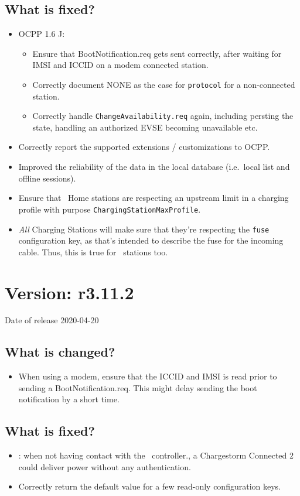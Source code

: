 \documentclass{scrartcl}
\begin{document}
\subsection*{What is fixed?}
\begin{itemize}
\item OCPP 1.6 J:
  \begin{itemize}
  \item Ensure that BootNotification.req gets sent correctly, after waiting
    for IMSI and ICCID on a modem connected station.
  \item Correctly document NONE as the case for \verb|protocol| for a
    non-connected station.
  \item Correctly handle \verb|ChangeAvailability.req| again, including
    persting the state, handling an authorized EVSE becoming unavailable etc.
  \end{itemize}
\item Correctly report the supported extensions / customizations to OCPP.
\item Improved the reliability of the data in the local database (i.e.\ local
  list and offline sessions).
\item Ensure that \nanogrid\ Home stations are respecting an upstream limit in
  a charging profile with purpose \verb|ChargingStationMaxProfile|.
\item \emph{All} Charging Stations will make sure that they're respecting the
  \verb|fuse| configuration key, as that's intended to describe the fuse for
  the incoming cable. Thus, this is true for \nanogrid\ stations too.
\end{itemize}

\section{Version: r3.11.2}
Date of release 2020-04-20
\subsection*{What is changed?}
\begin{itemize}
\item When using a modem, ensure that the ICCID and IMSI is read prior to
  sending a BootNotification.req. This might delay sending the boot
  notification by a short time.
\end{itemize}
\subsection*{What is fixed?}
\begin{itemize}
\item \nanogrid: when not having contact with the \nanogrid\ controller., a
  Chargestorm Connected 2 could deliver power without any authentication.
\item Correctly return the default value for a few read-only configuration keys.
\end{itemize}
\end{document}
